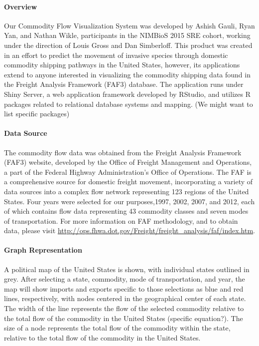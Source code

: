 \documentclass[12pt]{article}
\begin{document}
\paragraph*{Overview} 

Our Commodity Flow Visualization System was developed by Ashish Gauli, Ryan Yan, and Nathan Wikle, participants in the NIMBioS 2015 SRE cohort, working under the direction of Louis Gross and Dan Simberloff.  This product was created in an effort to predict the movement of invasive species through domestic commodity shipping pathways in the United States, however, its applications extend to anyone interested in visualizing the commodity shipping data found in the Freight Analysis Framework (FAF3) database.  The application runs under Shiny Server, a web application framework developed by RStudio, and utilizes R packages related to relational database systems and mapping. (We might want to list specific packages)  

\paragraph*{Data Source}

The commodity flow data was obtained from the Freight Analysis Framework (FAF3) website, developed by the Office of Freight Management and Operations, a part of the Federal Highway Administration's Office of Operations.  The FAF is a comprehensive source for domestic freight movement, incorporating a variety of data sources into a complex flow network representing 123 regions of the United States.  Four years were selected for our purposes,1997, 2002, 2007, and 2012, each of which contains flow data representing 43 commodity classes and seven modes of transportation.  For more information on FAF methodology, and to obtain data, please visit \url{http://ops.fhwa.dot.gov/Freight/freight_analysis/faf/index.htm}.

\paragraph*{Graph Representation}

A political map of the United States is shown, with individual states outlined in grey.  After selecting a state, commodity, mode of transportation, and year, the map will show imports and exports specific to those selections as blue and red lines, respectively, with nodes centered in the geographical center of each state.  The width of the line represents the flow of the selected commodity relative to the total flow of the commodity in the United States (specific equation?).  The size of a node represents the total flow of the commodity within the state, relative to the total flow of the commodity in the United States.
\end{document}
